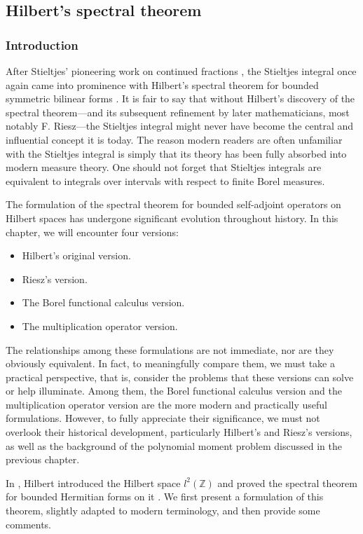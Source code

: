 \documentclass[12pt,b5paper,notitlepage]{article}
\theoremstyle{definition}
\theoremstyle{plain}
\newcommand{\Zbb}{\mathbb Z}
\numberwithin{equation}{section}
\begin{document}
\subsection{Hilbert's spectral theorem}


\subsubsection{Introduction}

After Stieltjes' pioneering work on continued fractions \cite{Sti94}, the Stieltjes integral once again came into prominence with Hilbert’s spectral theorem for bounded symmetric bilinear forms \cite{Hil06}. It is fair to say that without Hilbert's discovery of the spectral theorem---and its subsequent refinement by later mathematicians, most notably F. Riesz---the Stieltjes integral might never have become the central and influential concept it is today. The reason modern readers are often unfamiliar with the Stieltjes integral is simply that its theory has been fully absorbed into modern measure theory. One should not forget that Stieltjes integrals are equivalent to integrals over intervals with respect to finite Borel measures.


The formulation of the spectral theorem for bounded self-adjoint operators on Hilbert spaces has undergone significant evolution throughout history. In this chapter, we will encounter four versions: 
\begin{itemize}
\item Hilbert's original version.
\item Riesz's version.
\item The Borel functional calculus version.
\item The multiplication operator version.
\end{itemize}
The relationships among these formulations are not immediate, nor are they obviously equivalent. In fact, to meaningfully compare them, we must take a practical perspective, that is, consider the problems that these versions can solve or help illuminate. Among them, the Borel functional calculus version and the multiplication operator version are the more modern and practically useful formulations. However, to fully appreciate their significance, we must not overlook their historical development, particularly Hilbert's and Riesz's versions, as well as the background of the polynomial moment problem discussed in the previous chapter.




In \cite{Hil06}, Hilbert introduced the Hilbert space $l^2(\Zbb)$ and proved the spectral theorem for bounded Hermitian forms on it \cite[Satz 31]{Hil06}. We first present a formulation of this theorem, slightly adapted to modern terminology, and then provide some comments.
\end{document}
